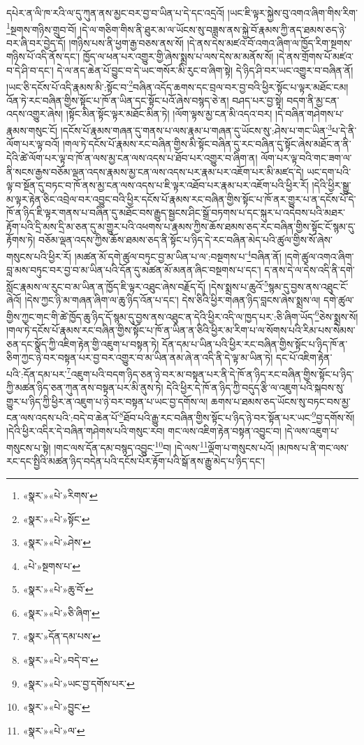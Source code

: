 དཔེར་ན་ལི་ཁ་རའི་ལ་དུ་ཀུན་ནས་མྱང་བར་བྱ་བ་ཡིན་པ་དེ་དང་འདྲའོ། །ཡང་ཇི་ལྟར་སྐྱེས་བུ་འགའ་ཞིག་གིས་རིག་\footnote{«སྣར་»«པེ་»རིགས་}སྔགས་གཉིས་གྲུབ་བོ། །དེ་ལ་གཅིག་གིས་ནི་ཐུར་མ་ལ་ཡོངས་སུ་བཟླས་ནས་སྐྱེ་བོ་རྣམས་ཀྱི་ནད་ཐམས་ཅད་ཉེ་བར་ཞི་བར་བྱེད་དོ། །གཉིས་པས་ནི་ཕྱག་རྒྱ་བཅས་ནས་སོ། །དེ་ནས་དེས་མཛའ་བོ་འགའ་ཞིག་ལ་ཁྱོད་རིག་སྔགས་གཉིས་པོ་འདི་ནོས་དང་། ཁྱོད་ལ་ཕན་པར་འགྱུར་གྱི་ཞེས་སྨྲས་པ་ལས་དེས་མ་མནོས་སོ། །དེ་ནས་གྲོགས་པོ་མཛའ་བ་དེ་ཤི་བ་དང་། དེ་ལ་ནད་ཆེན་པོ་བྱུང་བ་དེ་ཡང་གསོར་མི་རུང་བ་ཞིག་སྟེ། དེ་ཉིད་ཤི་བར་ཡང་འགྱུར་བ་བཞིན་ནོ། །ཡང་ཅི་དངོས་པོ་འདི་རྣམས་མི་:སྟོང་བ་\footnote{«སྣར་»«པེ་»སྟོང་}བཞིན་འདོད་ཆགས་དང་བྲལ་བར་བྱ་བའི་ཕྱིར་སྟོང་པ་ལྟར་མཐོང་ངམ། འོན་ཏེ་རང་བཞིན་གྱིས་སྟོང་པ་ཁོ་ན་ཡིན་དང་སྟོང་པའོ་ཞེས་བསྙད་ཅེ་ན། བཤད་པར་བྱ་སྟེ། བདག་ནི་མྱ་ངན་འདས་འགྱུར་ཞེས། །སྟོང་མིན་སྟོང་ལྟར་མཐོང་མིན་ཏེ། །ལོག་ལྟས་མྱ་ངན་མི་འདའ་བར། །དེ་བཞིན་གཤེགས་པ་རྣམས་གསུང་ངོ། །དངོས་པོ་རྣམས་གཞན་དུ་གནས་པ་ལས་རྣམ་པ་གཞན་དུ་ཡོངས་སུ་:ཤེས་པ་གང་ཡིན་\footnote{«སྣར་»«པེ་»ཤེས་}པ་དེ་ནི་ལོག་པར་ལྟ་བའོ། །གལ་ཏེ་དངོས་པོ་རྣམས་རང་བཞིན་གྱིས་མི་སྟོང་བཞིན་དུ་རང་བཞིན་དུ་སྟོང་ཞེས་མཐོང་ན་ནི་དེའི་ཚེ་ལོག་པར་ལྟ་བ་ཁོ་ན་ལས་མྱ་ངན་ལས་འདས་པ་ཐོབ་པར་འགྱུར་བ་ཞིག་ན། ལོག་པར་ལྟ་བའི་གང་ཟག་ལ་ནི་སངས་རྒྱས་བཅོམ་ལྡན་འདས་རྣམས་མྱ་ངན་ལས་འདས་པར་རྣམ་པར་འཇོག་པར་མི་མཛད་དེ། ཡང་དག་པའི་ལྟ་བ་སྔོན་དུ་བཏང་བ་ཁོ་ནས་མྱ་ངན་ལས་འདས་པ་ཇི་ལྟར་འཐོབ་པར་རྣམ་པར་འཇོག་པའི་ཕྱིར་རོ། །དེའི་ཕྱིར་སྒྱུ་མ་ལྟར་རྟེན་ཅིང་འབྲེལ་བར་འབྱུང་བའི་ཕྱིར་དངོས་པོ་རྣམས་རང་བཞིན་གྱིས་སྟོང་པ་ཁོ་ནར་གྱུར་པ་ན་དངོས་པོ་དེ་ཁོ་ན་ཉིད་ཇི་ལྟར་གནས་པ་བཞིན་དུ་མཐོང་བས་རྒྱུད་སྦྱངས་ཤིང་སྒྲོ་བཏགས་པ་དང་སྐུར་པ་འདེབས་པའི་མཐར་རྟོག་པའི་དྲི་མས་དྲི་མ་ཅན་དུ་མ་གྱུར་པའི་འཕགས་པ་རྣམས་ཀྱིས་ཆོས་ཐམས་ཅད་རང་བཞིན་གྱིས་སྟོང་ངོ་སྙམ་དུ་རྟོགས་ཏེ། བཅོམ་ལྡན་འདས་ཀྱིས་ཆོས་ཐམས་ཅད་ནི་སྟོང་པ་ཉིད་དེ་རང་བཞིན་མེད་པའི་ཚུལ་གྱིས་སོ་ཞེས་གསུངས་པའི་ཕྱིར་རོ། །མཚན་མོ་དགེ་ཚུལ་བཏུང་བྱ་མ་ཡིན་པ་ལ་:བསྔགས་པ་\footnote{«པེ་»སྔགས་པ་}བཞིན་ནོ། །དགེ་ཚུལ་འགའ་ཞིག་བླ་མས་བཏུང་བར་བྱ་བ་མ་ཡིན་པའི་དོན་དུ་མཚན་མོ་མནན་ཞིང་བསྔགས་པ་དང་། ད་ནས་དེ་ལ་དེས་འདི་ནི་དགེ་སློང་རྣམས་ལ་རུང་བ་མ་ཡིན་ན་ཁྱོད་ཇི་ལྟར་འཐུང་ཞེས་བརྗོད་དོ། །དེས་སྨྲས་པ་ཆུའོ་\footnote{«སྣར་»«པེ་»ཆུ་བོ་}སྙམ་དུ་བྱས་ནས་འཐུང་ངོ་ཞེའོ། །དེས་ཀྱང་ཉི་མ་གཞན་ཞིག་ལ་ཆུ་ཉིད་འོན་པ་དང་། དེས་ཅིའི་ཕྱིར་གཞན་ཉིད་བླངས་ཞེས་སྨྲས་ལ། དགེ་ཚུལ་གྱིས་ཀྱང་གང་གི་ཚེ་ཁྱོད་ཆུ་ཉིད་དོ་སྙམ་དུ་བྱས་ནས་འཐུང་ན་དེའི་ཕྱིར་འདི་ལ་ཁྱད་པར་:ཅི་ཞིག་ཡོད་\footnote{«སྣར་»«པེ་»ཅི་ཞིག་}ཅེས་སྨྲས་སོ། །གལ་ཏེ་དངོས་པོ་རྣམས་རང་བཞིན་གྱིས་སྟོང་པ་ཁོ་ན་ཡིན་ན་ཅིའི་ཕྱིར་མ་རིག་པ་ལ་སོགས་པའི་རིམ་པས་སེམས་ཅན་དང་སྣོད་ཀྱི་འཇིག་རྟེན་གྱི་འཇུག་པ་བསྟན་ཏེ། དོན་དམ་པ་ཡིན་པའི་ཕྱིར་རང་བཞིན་གྱིས་སྟོང་པ་ཉིད་ཁོ་ན་ཅིག་ཀྱང་ཉེ་བར་བསྟན་པར་བྱ་བར་འགྱུར་བ་མ་ཡིན་ནམ་ཞེ་ན་འདི་ནི་དེ་ལྟ་མ་ཡིན་ཏེ། དང་པོ་འཇིག་རྟེན་པའི་:དོན་དམ་པར་\footnote{«སྣར་»དོན་དམ་པས་}འཇུག་པའི་བདག་ཉིད་ཅན་ཉེ་བར་མ་བསྟན་པར་ནི་དེ་ཁོ་ན་ཉིད་རང་བཞིན་གྱིས་སྟོང་པ་ཉིད་ཀྱི་མཚན་ཉིད་ཅན་ཀུན་ནས་བསྟན་པར་མི་ནུས་ཏེ། དེའི་ཕྱིར་དེ་ཁོ་ན་ཉིད་ཀྱི་བདུད་རྩི་ལ་འཇུག་པའི་སྐབས་སུ་གྱུར་པ་ཉིད་ཀྱི་ཕྱིར་ན་འཇུག་པ་ཉེ་བར་བསྟན་པ་ཡང་བྱ་དགོས་ལ། ཆགས་པ་ཐམས་ཅད་ཡོངས་སུ་བཏང་བས་མྱ་ངན་ལས་འདས་པའི་:བདེ་བ་ཆེན་པོ་\footnote{«སྣར་»«པེ་»བདེ་བ་}ཐོབ་པའི་རྒྱུ་རང་བཞིན་གྱིས་སྟོང་པ་ཉིད་ཉེ་བར་སྟོན་པར་ཡང་\footnote{«སྣར་»«པེ་»ཡང་བྱ་དགོས་པར་}བྱ་དགོས་སོ། །དེའི་ཕྱིར་འདིར་དེ་བཞིན་གཤེགས་པའི་གསུང་རབ། གང་ལས་འཇིག་རྟེན་བསྟན་འབྱུང་བ། །དེ་ལས་འཇུག་པ་གསུངས་པ་སྟེ། །གང་ལས་དོན་དམ་བསྙད་འབྱུང་\footnote{«སྣར་»«པེ་»བྱུང་}བ། །དེ་ལས་\footnote{«སྣར་»«པེ་»ལ་}ལྡོག་པ་གསུངས་པའོ། །མཁས་པ་ནི་གང་ལས་རང་དང་སྤྱིའི་མཚན་ཉིད་བདེན་པའི་དངོས་པོར་རྟོག་པའི་སྒོ་ནས་རྒྱུ་མེད་པ་ཉིད་དང་། 